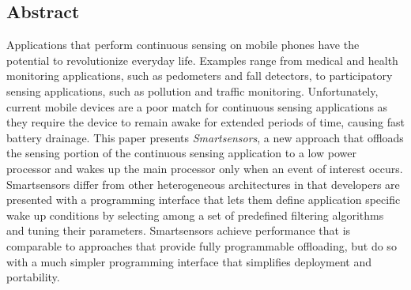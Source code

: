 \subsection*{Abstract}
 
  Applications that perform continuous sensing on mobile phones have
  the potential to revolutionize everyday life.  Examples range from
  medical and health monitoring applications, such as pedometers and
  fall detectors, to participatory sensing applications, such as
  pollution and traffic monitoring.  Unfortunately, current mobile
  devices are a poor match for continuous sensing applications as they
  require the device to remain awake for extended periods of time,
  causing fast battery drainage.  This paper presents {\em
  Smartsensors}\/, a new approach that offloads the sensing
  portion of the continuous sensing application to a low power
  processor and wakes up the main processor only when an event of
  interest occurs.  Smartsensors differ from other heterogeneous
  architectures in that developers are presented with a programming
  interface that lets them define application specific wake up
  conditions by selecting among a set of predefined filtering
  algorithms and tuning their parameters.  Smartsensors achieve
  performance that is comparable to approaches that provide fully
  programmable offloading, but do so with a much simpler programming
  interface that simplifies deployment and portability.


